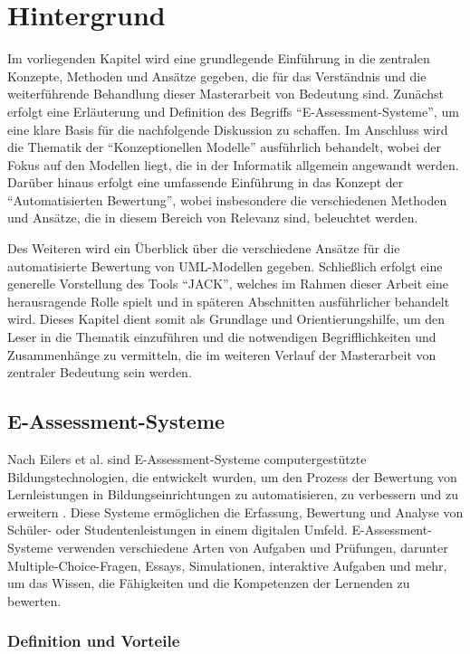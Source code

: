 \chapter{Hintergrund}

Im vorliegenden Kapitel wird eine grundlegende Einführung in die zentralen Konzepte, Methoden und Ansätze gegeben, die
für das Verständnis und die weiterführende Behandlung dieser Masterarbeit von Bedeutung sind. Zunächst erfolgt eine
Erläuterung und Definition des Begriffs ``E-Assessment-Systeme'', um eine klare Basis für die nachfolgende Diskussion
zu schaffen. Im Anschluss wird die Thematik der ``Konzeptionellen Modelle'' ausführlich behandelt, wobei der Fokus auf
den Modellen liegt, die in der Informatik allgemein angewandt werden. Darüber hinaus erfolgt eine umfassende Einführung
in das Konzept der ``Automatisierten Bewertung'', wobei insbesondere die verschiedenen Methoden und Ansätze, die in
diesem Bereich von Relevanz sind, beleuchtet werden.

Des Weiteren wird ein Überblick über die verschiedene Ansätze für die automatisierte Bewertung von UML-Modellen gegeben.
Schließlich erfolgt eine generelle Vorstellung des Tools ``JACK'', welches im Rahmen dieser Arbeit eine herausragende
Rolle spielt und in späteren Abschnitten ausführlicher behandelt wird. Dieses Kapitel dient somit als Grundlage und
Orientierungshilfe, um den Leser in die Thematik einzuführen und die notwendigen Begrifflichkeiten und Zusammenhänge zu
vermitteln, die im weiteren Verlauf der Masterarbeit von zentraler Bedeutung sein werden.

\section{E-Assessment-Systeme}
    Nach Eilers et al. sind E-Assessment-Systeme computergestützte Bildungstechnologien, die entwickelt wurden, um den Prozess der Bewertung von Lernleistungen in Bildungseinrichtungen zu automatisieren, zu verbessern und zu erweitern \cite{eilers2008konzeption}. Diese Systeme ermöglichen die Erfassung, Bewertung und Analyse von Schüler- oder Studentenleistungen in einem digitalen Umfeld. E-Assessment-Systeme verwenden verschiedene Arten von Aufgaben und Prüfungen, darunter Multiple-Choice-Fragen, Essays, Simulationen, interaktive Aufgaben und mehr, um das Wissen, die Fähigkeiten und die Kompetenzen der Lernenden zu bewerten.
    
\subsection{Definition und Vorteile}

